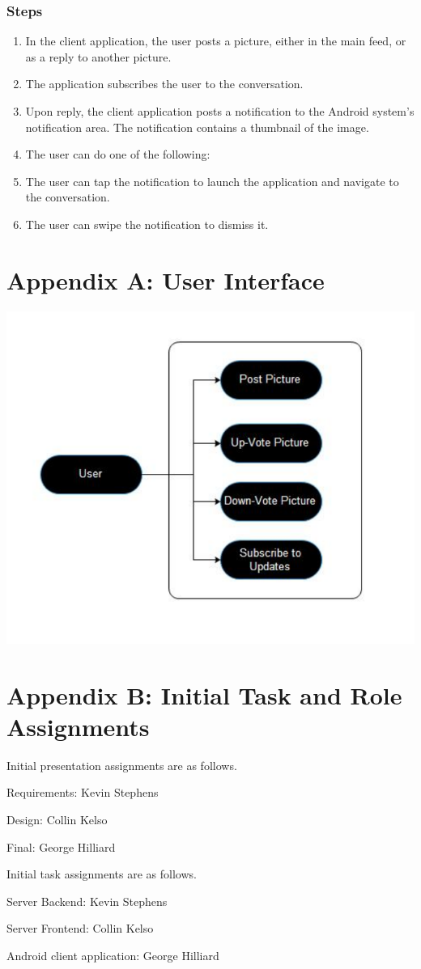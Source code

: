 \documentclass[11pt]{scrartcl}
\let\stdsection\section
\renewcommand\section{\newpage\stdsection}
\begin{document}
        \subsubsection{Steps}
            \begin{enumerate}
                \item In the client application, the user posts a picture, either in the main feed, or as a reply to another picture.
                \item The application subscribes the user to the conversation.
                \item Upon reply, the client application posts a notification to the Android system's notification area.  The notification contains a thumbnail of the image.
                \item The user can do one of the following:
                \item The user can tap the notification to launch the application and navigate to the conversation.
                \item The user can swipe the notification to dismiss it.
            \end{enumerate}

\section*{Appendix A: User Interface}
    \includegraphics{useCase}

\section*{Appendix B: Initial Task and Role Assignments}
    Initial presentation assignments are as follows.
    \begin{description*}
        \item[Requirements:] Kevin Stephens
        \item[Design:] Collin Kelso
        \item[Final:] George Hilliard
    \end{description*}

    Initial task assignments are as follows.
    \begin{description*}
        \item[Server Backend:] Kevin Stephens
        \item[Server Frontend:] Collin Kelso
        \item[Android client application:] George Hilliard
    \end{description*}
\end{document}
